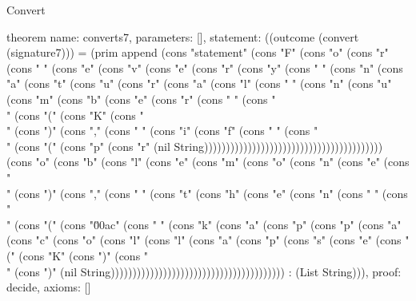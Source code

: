 \begin{lexlean}{Convert}
\begin{semanticmodule}
theorem{
  name: converts7,
  parameters: [],
  statement: ((outcome (convert (signature7))) = (prim append (cons "statement" (cons "F" (cons "o" (cons "r" (cons " " (cons "e" (cons "v" (cons "e" (cons "r" (cons "y" (cons " " (cons "n" (cons "a" (cons "t" (cons "u" (cons "r" (cons "a" (cons "l" (cons " " (cons "n" (cons "u" (cons "m" (cons "b" (cons "e" (cons "r" (cons " " (cons "\\" (cons "(" (cons "K" (cons "\\" (cons ")" (cons "," (cons " " (cons "i" (cons "f" (cons " " (cons "\\" (cons "(" (cons "p" (cons "r" (nil String))))))))))))))))))))))))))))))))))))))))) (cons "o" (cons "b" (cons "l" (cons "e" (cons "m" (cons "o" (cons "n" (cons "e" (cons "\\" (cons ")" (cons "," (cons " " (cons "t" (cons "h" (cons "e" (cons "n" (cons " " (cons "\\" (cons "(" (cons "\u00ac" (cons " " (cons "k" (cons "a" (cons "p" (cons "p" (cons "a" (cons "c" (cons "o" (cons "l" (cons "l" (cons "a" (cons "p" (cons "s" (cons "e" (cons "(" (cons "K" (cons ")" (cons "\\" (cons ")" (nil String)))))))))))))))))))))))))))))))))))))))) : (List String))),
  proof: decide{},
  axioms: []
}


\end{semanticmodule}
\end{lexlean}
